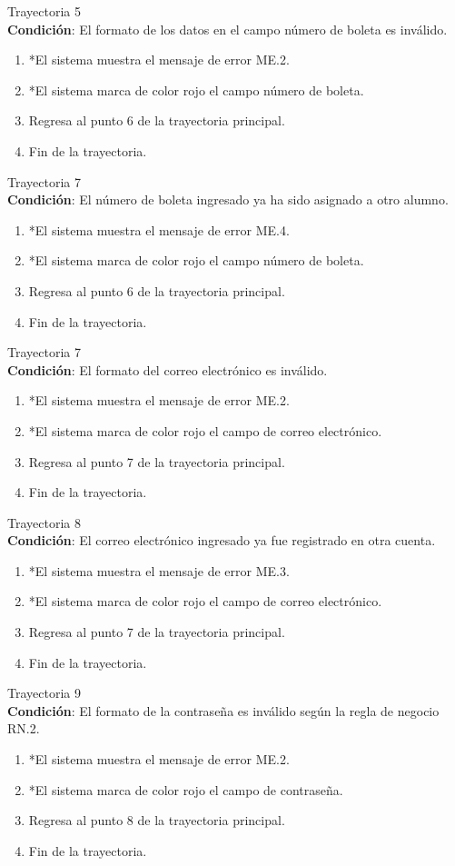 \large{Trayectoria 5}\\
\textbf{Condición}: El formato de los datos en el campo número de boleta es inválido.
\begin{enumerate}
    \item *El sistema muestra el mensaje de error ME.2.
    \item *El sistema marca de color rojo el campo número de boleta.
    \item Regresa al punto 6 de la trayectoria principal.
    \item Fin de la trayectoria.
\end{enumerate}
\large{Trayectoria 7}\\
\textbf{Condición}: El número de boleta ingresado ya ha sido asignado a otro alumno.
\begin{enumerate}
    \item *El sistema muestra el mensaje de error ME.4.
    \item *El sistema marca de color rojo el campo número de boleta.
    \item Regresa al punto 6 de la trayectoria principal.
    \item Fin de la trayectoria.
\end{enumerate}
\large{Trayectoria 7}\\
\textbf{Condición}: El formato del correo electrónico es inválido.
\begin{enumerate}
    \item *El sistema muestra el mensaje de error ME.2.
    \item *El sistema marca de color rojo el campo de correo electrónico.
    \item Regresa al punto 7 de la trayectoria principal.
    \item Fin de la trayectoria.
\end{enumerate}
\large{Trayectoria 8}\\
\textbf{Condición}: El correo electrónico ingresado ya fue registrado en otra cuenta.
\begin{enumerate}
    \item *El sistema muestra el mensaje de error ME.3.
    \item *El sistema marca de color rojo el campo de correo electrónico.
    \item Regresa al punto 7 de la trayectoria principal.
    \item Fin de la trayectoria.
\end{enumerate}
\large{Trayectoria 9}\\
\textbf{Condición}: El formato de la contraseña es inválido según la regla de negocio RN.2.
\begin{enumerate}
    \item *El sistema muestra el mensaje de error ME.2.
    \item *El sistema marca de color rojo el campo de contraseña.
    \item Regresa al punto 8 de la trayectoria principal.
    \item Fin de la trayectoria.
\end{enumerate}